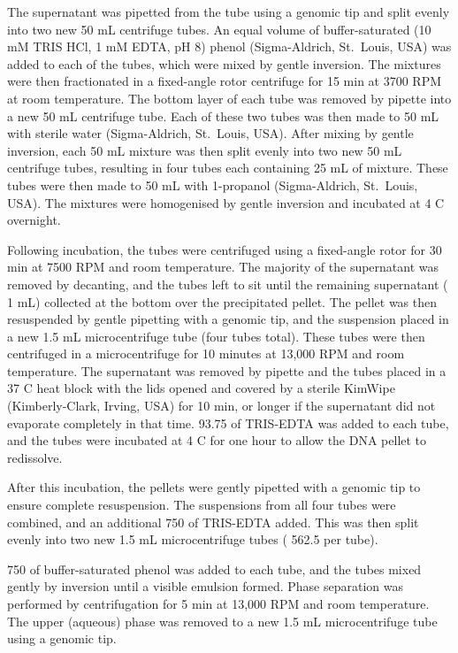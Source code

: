 The supernatant was pipetted from the tube using a genomic tip and split evenly into two new 50 mL centrifuge tubes.
An equal volume of buffer-saturated (10 mM TRIS HCl, 1 mM EDTA, pH 8) phenol (Sigma-Aldrich, St.\ Louis, USA) was added to each of the tubes, which were mixed by gentle inversion.
The mixtures were then fractionated in a fixed-angle rotor centrifuge for 15 min at 3700 RPM at room temperature.
The bottom layer of each tube was removed by pipette into a new 50 mL centrifuge tube.
Each of these two tubes was then made to 50 mL with sterile water (Sigma-Aldrich, St.\ Louis, USA).
After mixing by gentle inversion, each 50 mL mixture was then split evenly into two new 50 mL centrifuge tubes, resulting in four tubes each containing 25 mL of mixture.
These tubes were then made to 50 mL with 1-propanol (Sigma-Aldrich, St.\ Louis, USA).
The mixtures were homogenised by gentle inversion and incubated at 4 \textdegree{}C overnight.

Following incubation, the tubes were centrifuged using a fixed-angle rotor for 30 min at 7500 RPM and room temperature.
The majority of the supernatant was removed by decanting, and the tubes left to sit until the remaining supernatant (\textapprox{} 1 mL) collected at the bottom over the precipitated pellet.
The pellet was then resuspended by gentle pipetting with a genomic tip, and the suspension placed in a new 1.5 mL microcentrifuge tube (four tubes total).
These tubes were then centrifuged in a microcentrifuge for 10 minutes at 13,000 RPM and room temperature.
The supernatant was removed by pipette and the tubes placed in a 37 \textdegree{}C heat block with the lids opened and covered by a sterile KimWipe (Kimberly-Clark, Irving, USA) for 10 min, or longer if the supernatant did not evaporate completely in that time.
93.75 \microlitre{} of TRIS-EDTA was added to each tube, and the tubes were incubated at 4 \textdegree{}C for one hour to allow the DNA pellet to redissolve.

After this incubation, the pellets were gently pipetted with a genomic tip to ensure complete resuspension.
The suspensions from all four tubes were combined, and an additional 750 \microlitre{} of TRIS-EDTA added.
This was then split evenly into two new 1.5 mL microcentrifuge tubes (\textapprox{} 562.5 \microlitre{} per tube).

750 \microlitre{} of buffer-saturated phenol was added to each tube, and the tubes mixed gently by inversion until a visible emulsion formed.
Phase separation was performed by centrifugation for 5 min at 13,000 RPM and room temperature.
The upper (aqueous) phase was removed to a new 1.5 mL microcentrifuge tube using a genomic tip.

